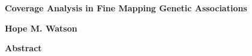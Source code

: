 \thispagestyle{plain}
\begin{center}
    \Large
    \textbf{Coverage Analysis in Fine Mapping Genetic Associations}
    
    \vspace{0.8cm}
    
    \textbf{Hope M. Watson}
    
    \vspace{0.9cm}
    \textbf{Abstract}
    
\end{center}